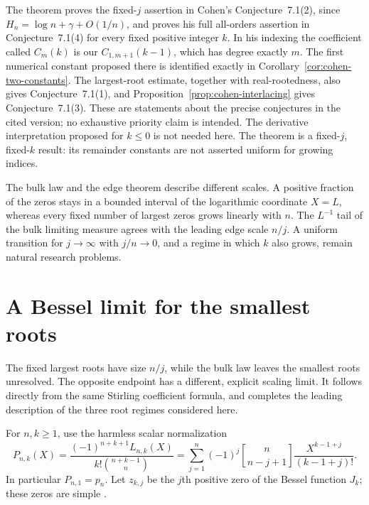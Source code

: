 \documentclass[11pt]{article}
\numberwithin{equation}{section}
\theoremstyle{definition}
\theoremstyle{remark}
\newcommand{\stirling}[2]{\genfrac{[}{]}{0pt}{}{#1}{#2}}
\begin{document}
The theorem proves the fixed-$j$ assertion in Cohen's
Conjecture~7.1(2), since $H_n=\log n+\gamma+O(1/n)$, and proves
his full all-orders assertion in Conjecture~7.1(4) for every fixed
positive integer $k$.  In his indexing the coefficient called
$C_m(k)$ is our $C_{1,m+1}(k-1)$, which has degree exactly $m$.
The first numerical constant proposed there is identified exactly
in Corollary~\ref{cor:cohen-two-constants}.
The largest-root estimate, together with real-rootedness, also gives
Conjecture~7.1(1), and Proposition~\ref{prop:cohen-interlacing}
gives Conjecture~7.1(3).  These are statements about the precise
conjectures in the cited version; no exhaustive priority claim is
intended.  The derivative interpretation proposed for $k\leq0$
is not needed here.  The theorem is a fixed-$j$, fixed-$k$ result:
its remainder constants are not asserted uniform for growing indices.

The bulk law and the edge theorem describe different scales.
A positive fraction of the zeros stays in a bounded interval of the
logarithmic coordinate $X=L$, whereas every fixed number of largest
zeros grows linearly with $n$.  The $L^{-1}$ tail of the bulk limiting
measure agrees with the leading edge scale $n/j$.  A uniform
transition for $j\to\infty$ with $j/n\to0$, and a regime in which
$k$ also grows, remain natural research problems.

\section{A Bessel limit for the smallest roots}
\label{sec:bessel-edge}

The fixed largest roots have size $n/j$, while the bulk law leaves the
smallest roots unresolved. The opposite endpoint has a different,
explicit scaling limit. It follows directly from the same Stirling
coefficient formula, and completes the leading description of the
three root regimes considered here.

For $n,k\geq1$, use the harmless scalar normalization
\begin{equation}\label{eq:bessel-normalization}
 P_{n,k}(X)=\frac{(-1)^{n+k+1}L_{n,k}(X)}
                   {k!\binom{n+k-1}{n}}
 =\sum_{j=1}^n(-1)^j\stirling{n}{n-j+1}
                     \frac{X^{k-1+j}}{(k-1+j)!}.
\end{equation}
In particular $P_{n,1}=p_n$. Let $z_{k,j}$ be the $j$th positive
zero of the Bessel function $J_k$; these zeros are simple
\cite{DLMFBessel}.
\end{document}
